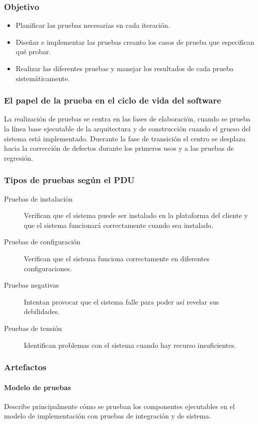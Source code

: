 \subsubsection{Objetivo}
\begin{itemize}
	\item Planificar las pruebas necesarias en cada iteración.
	\item Diseñar e implementar las pruebas creanto los casos de prueba que especifican qué probar.
	\item Realizar las diferentes pruebas y manejar los resultados de cada prueba sistemáticamente.
\end{itemize}
\subsubsection{El papel de la prueba en el ciclo de vida del software}
La realización de pruebas se centra en las fases de elaboración, cuando se prueba la línea base ejecutable de la arquitectura y de construcción cuando el grueso del sistema está implementado. Duerante la fase de transición el centro se desplaza hacia la corrección de defectos durante los primeros usos y a las pruebas de regresión.
\subsubsection{Tipos de pruebas según el PDU}
\begin{description}
	\item[Pruebas de instalación] Verifican que el sistema puede ser instalado en la plataforma del cliente y que el sistema funcionará correctamente cuando sea instalado.
	\item[Pruebas de configuración] Verifican que el sistema funciona correctamente en diferentes configuraciones.
	\item[Pruebas negativas] Intentan provocar que el sistema falle para poder así revelar sus debilidades.
	\item[Peuebas de tensión] Identifican problemas con el sistema cuando hay recurso insuficientes.
\end{description}
\subsubsection{Artefactos}
\paragraph{Modelo de pruebas}
Describe principalmente cómo se prueban los componentes ejecutables en el modelo de implementación con pruebas de integración y de sistema.
